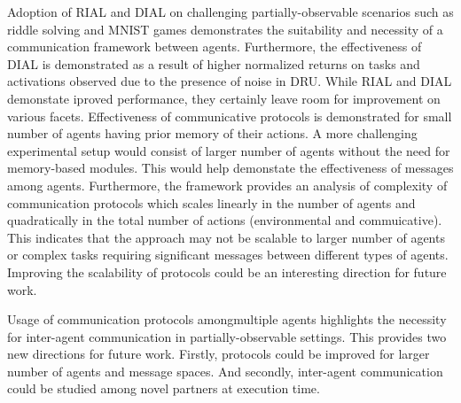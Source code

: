 \documentclass[11pt,letterpaper]{article}
\begin{document}
Adoption of RIAL and DIAL on challenging partially-observable scenarios such as riddle solving and MNIST games demonstrates the suitability and necessity of a communication framework between agents. Furthermore, the effectiveness of DIAL is demonstrated as a result of higher normalized returns on tasks and activations observed due to the presence of noise in DRU. While RIAL and DIAL demonstate iproved performance, they certainly leave room for improvement on various facets. Effectiveness of communicative protocols is demonstrated for small number of agents having prior memory of their actions. A more challenging experimental setup would consist of larger number of agents without the need for memory-based modules. This would help demonstate the effectiveness of messages among agents. Furthermore, the framework provides an analysis of complexity of communication protocols which scales linearly in the number of agents and quadratically in the total number of actions (environmental and commuicative). This indicates that the approach may not be scalable to larger number of agents or complex tasks requiring significant messages between different types of agents. Improving the scalability of protocols could be an interesting direction for future work. 

Usage of communication protocols amongmultiple agents highlights the necessity for inter-agent communication in partially-observable settings. This provides two new directions for future work. Firstly, protocols could be improved for larger number of agents and message spaces. And secondly, inter-agent communication could be studied among novel partners at execution time. 
\end{document}
